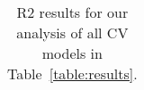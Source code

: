 \begin{table}[t]
\begin{center}
\begin{tabular}{|c|c|c|c|c|c|}
\hline
\end{tabular}
\vspace{-5mm}
\end{center}
\caption{R2 results for our analysis of all CV models in Table~\ref{table:results}. }
\label{table:R2results}
\end{table}

